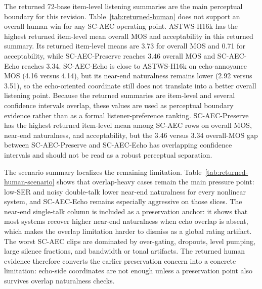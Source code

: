 \documentclass[journal]{IEEEtran}
\begin{document}



The returned 72-base item-level listening summaries are the main perceptual boundary for this revision. Table~\ref{tab:returned-human} does not support an overall human win for any SC-AEC operating point. ASTWS-H16k has the highest returned item-level mean overall MOS and acceptability in this returned summary. Its returned item-level means are 3.73 for overall MOS and 0.71 for acceptability, while SC-AEC-Preserve reaches 3.46 overall MOS and SC-AEC-Echo reaches 3.34. SC-AEC-Echo is close to ASTWS-H16k on echo-annoyance MOS (4.16 versus 4.14), but its near-end naturalness remains lower (2.92 versus 3.51), so the echo-oriented coordinate still does not translate into a better overall listening point. Because the returned summaries are item-level and several confidence intervals overlap, these values are used as perceptual boundary evidence rather than as a formal listener-preference ranking. SC-AEC-Preserve has the highest returned item-level mean among SC-AEC rows on overall MOS, near-end naturalness, and acceptability, but the 3.46 versus 3.34 overall-MOS gap between SC-AEC-Preserve and SC-AEC-Echo has overlapping confidence intervals and should not be read as a robust perceptual separation.

The scenario summary localizes the remaining limitation. Table~\ref{tab:returned-human-scenario} shows that overlap-heavy cases remain the main pressure point: low-SER and noisy double-talk lower near-end naturalness for every nonlinear system, and SC-AEC-Echo remains especially aggressive on those slices. The near-end single-talk column is included as a preservation anchor: it shows that most systems recover higher near-end naturalness when echo overlap is absent, which makes the overlap limitation harder to dismiss as a global rating artifact. The worst SC-AEC clips are dominated by over-gating, dropouts, level pumping, large silence fractions, and bandwidth or tonal artifacts. The returned human evidence therefore converts the earlier preservation concern into a concrete limitation: echo-side coordinates are not enough unless a preservation point also survives overlap naturalness checks.
\end{document}
